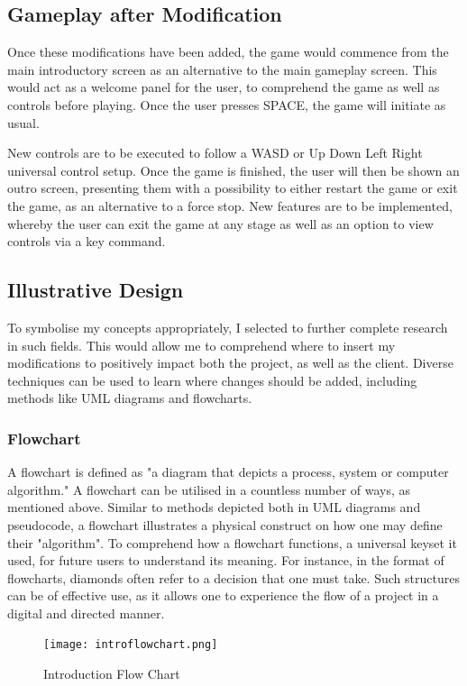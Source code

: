 \documentclass{article}
\begin{document}
\subsection{Gameplay after Modification}
Once these modifications have been added, the game would commence from the main introductory screen as an alternative to the main gameplay screen. This would act as a welcome panel for the user, to comprehend the game as well as controls before playing. Once the user presses SPACE, the game will initiate as usual.

New controls are to be executed to follow a WASD or Up Down Left Right universal control setup. Once the game is finished, the user will then be shown an outro screen, presenting them with a possibility to either restart the game or exit the game, as an alternative to a force stop. New features are to be implemented, whereby the user can exit the game at any stage as well as an option to view controls via a key command.

\subsection{Illustrative Design}
To symbolise my concepts appropriately, I selected to further complete research in such fields. This would allow me to comprehend where to insert my modifications to positively impact both the project, as well as the client. Diverse techniques can be used to learn where changes should be added, including methods like UML diagrams and flowcharts.
\subsubsection{Flowchart}\label{sec:flowcharts}
A flowchart is defined as "a diagram that depicts a process, system or computer algorithm." A flowchart can be utilised in a countless number of ways, as mentioned above. Similar to methods depicted both in UML diagrams and pseudocode, a flowchart illustrates a physical construct on how one may define their "algorithm".  To comprehend how a flowchart functions, a universal keyset it used, for future users to understand its meaning. For instance, in the format of flowcharts, diamonds often refer to a decision that one must take. Such structures can be of effective use, as it allows one to experience the flow of a project in a digital and directed manner.

\begin{figure}[H]
    \centering
    \texttt{[image: introflowchart.png]}
    \caption[Introduction Flow Chart]{Introduction Flow Chart}
    \label{fig:flowchart}
\end{figure}
\end{document}
